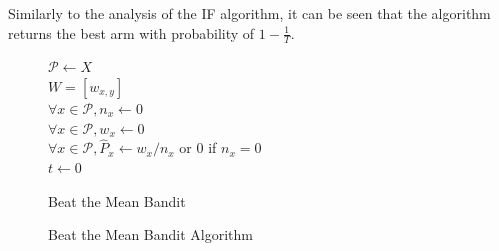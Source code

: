 \documentclass[MSc,beforeExam]{iitcsthesis}
\begin{document}
	Similarly to the analysis of the IF algorithm, it can be seen that the algorithm returns the best arm with probability of $1-\frac{1}{T}$.	
	
	\begin{figure}[h]
	\IncMargin{1em}
		\begin{algorithm}[H]
		
			$ \mathcal{P} \leftarrow X $\\
			$ W = [w_{x,y}]$\\
			$ \forall x \in \mathcal{P} , n_x \leftarrow 0 $\\
			$ \forall x \in \mathcal{P} , w_x \leftarrow 0 $\\
			$ \forall x \in \mathcal{P} ,\hat{P}_x \leftarrow w_x / n_x$ or $0$ if $n_x = 0 $\\
			$t \leftarrow 0$ \\
			\BlankLine
			\caption{Beat the Mean Bandit}
		\end{algorithm}
		\caption{Beat the Mean Bandit Algorithm}\label{algo_BTM}
	\end{figure}
\newpage
\end{document}
